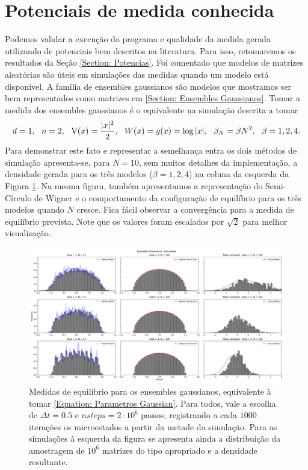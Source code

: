 \section{Potenciais de medida conhecida}

Podemos validar a execução do programa e qualidade da medida gerada utilizando de potenciais bem descritos na literatura. Para isso, retomaremos os resultados da Seção \ref{Section: Potencias}. Foi comentado que modelos de matrizes aleatórias são úteis em simulações das medidas quando um modelo está disponível. A família de ensembles gaussianos são modelos que mostramos ser bem representados como matrizes em \ref{Section: Ensembles Gaussianos}. Tomar a medida dos ensembles gaussianos é o equivalente na simulação descrita a tomar 
\begin{equation}
d = 1, \ \  n = 2, \ \ \operatorname{V}(x)=\frac{|x|^2}{2}, \ \ W(x) = g(x) = \log{|x|}, \ \ \beta_N = \beta N^2, \ \ \beta = 1,2,4.
\label{Equation: Parametros Gaussian}
\end{equation}
Para demonstrar este fato e representar a semelhança entra os dois métodos de simulação apresenta-se, para $N=10$, sem muitos detalhes da implementação, a densidade gerada para os três modelos ($\beta = 1,2,4$) na coluna da esquerda da Figura \ref{Figura: Gaussian}. Na mesma figura, também apresentamos a representação do Semi-Círculo de Wigner e o comportamento da configuração de equilíbrio para os três modelos quando $N$ cresce. Fica fácil observar a convergência para a medida de equilíbrio prevista. Note que os valores foram escalados por $\sqrt{2}$ para melhor visualização.
\begin{figure}[ht]
	\includegraphics[width=\textwidth]{Assets/validationGaussianTracy.png}
	\caption{Medidas de equilíbrio para os ensembles gaussianos, equivalente à tomar \ref{Equation: Parametros Gaussian}. Para todos, vale a escolha de $\Delta t = 0.5$ e $nsteps = 2\cdot10^6$ passos, registrando a cada $1000$ iterações os microestados a partir da metade da simulação. Para as simulações à esquerda da figura se apresenta ainda a distribuição da amostragem de $10^6$ matrizes do tipo apropriado e a densidade resultante.}
	\label{Figura: Gaussian}
\end{figure}

